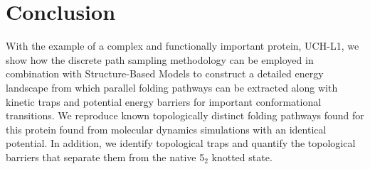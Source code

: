 \documentclass[journal=jacsat]{achemso}
\begin{document}
\section{Conclusion}
With the example of a complex and functionally important protein, UCH-L1, we show how the discrete path sampling methodology can be employed in combination with Structure-Based Models to construct a detailed energy landscape from which parallel folding pathways can be extracted along with kinetic traps and potential energy barriers for important conformational transitions. We reproduce known topologically distinct folding pathways found for this protein found from molecular dynamics simulations with an identical potential. In addition, we identify topological traps and quantify the topological barriers that separate them from the native 5$_2$ knotted state. 
%

\end{document}
